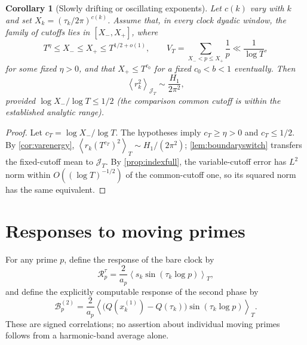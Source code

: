 \documentclass[11pt,reqno]{amsart}
\numberwithin{equation}{section}
\newtheorem{corollary}[theorem]{Corollary}
\newcommand{\av}[1]{\left\langle #1\right\rangle_T}
\newcommand{\avgJ}[1]{\left\langle #1\right\rangle_{\mathcal J_T}}
\begin{document}
\begin{corollary}[Slowly drifting or oscillating exponents]\label{cor:indexvariableleading}
Let $c(k)$ vary with $k$ and set $X_k=(\tau_k/2\pi)^{c(k)}$.
Assume that, in every clock dyadic window, the family of cutoffs
lies in $[X_-,X_+]$, where
\begin{equation}\label{eq:indexvarycond}
T^{\eta}\le X_-\le X_+\le T^{1/2+o(1)},
\qquad V_T=\sum_{X_-<p\le X_+}\frac1p\ll\frac1{\log T},
\end{equation}
for some fixed $\eta>0$, and that $X_+\le T^{c_0}$ for a fixed
$c_0<b<1$ eventually. Then
\begin{equation}\label{eq:indexvariableleading}
\avgJ{r_k^2}\sim\frac{H_1}{2\pi^2},
\end{equation}
provided $\log X_-/\log T\le1/2$ (the comparison common cutoff
is within the established analytic range).
\end{corollary}
\begin{proof}
Let $c_T=\log X_-/\log T$. The hypotheses imply
$c_T\ge\eta>0$ and $c_T\le1/2$.
By \cref{cor:varenergy}, $\av{r_k(T^{c_T})^2}\sim H_1/(2\pi^2)$;
\cref{lem:boundaryswitch} transfers the fixed-cutoff mean to
$\mathcal J_T$. By \cref{prop:indexfull}, the variable-cutoff
error has $L^2$ norm within $O((\log T)^{-1/2})$ of the common-cutoff
one, so its squared norm has the same equivalent.
\end{proof}


\section{Responses to moving primes}\label{sec:responses}
For any prime $p$, define the response of the bare clock by
\begin{equation}\label{eq:Rresponse}
\mathcal R_p^\tau
=\frac2{a_p}\av{s_k\sin(\tau_k\log p)},
\end{equation}
and define the explicitly computable response of the second
phase by
\begin{equation}\label{eq:Bresponse}
\mathcal B_p^{(2)}
=\frac2{a_p}\av{\bigl(Q(x_k^{(1)})-Q(\tau_k)\bigr)
\sin(\tau_k\log p)}.
\end{equation}
These are signed correlations; no assertion about individual
moving primes follows from a harmonic-band average alone.
\end{document}
